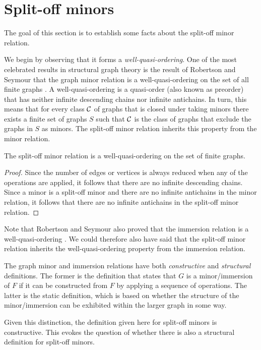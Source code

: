 \documentclass[11pt]{article}
\begin{document}
\section{Split-off minors}
The goal of this section is to establish some facts about the split-off minor relation. 
\par 
We begin by observing that it forms a \emph{well-quasi-ordering}.
One of the most celebrated results in structural graph theory is the result of Robertson and Seymour that the graph minor relation is a well-quasi-ordering on the set of all finite graphs \cite{ROBERTSON2004325}. A well-quasi-ordering is a quasi-order (also known as preorder) that has neither infinite descending chains nor infinite antichains.
In turn, this means that for every class $\mathcal{C}$ of graphs that is closed under taking minors there exists a finite set of graphs $S$ such that $\mathcal{C}$ is the class of graphs that exclude the graphs in $S$ as minors.
The split-off minor relation inherits this property from the minor relation.
\begin{proposition}
\label{prop:split-off-is-wqo}
    The split-off minor relation is a well-quasi-ordering on the set of finite graphs.
\end{proposition}
\begin{proof}
    Since the number of edges or vertices is always reduced when any of the operations are applied, it follows that there are no infinite descending chains. Since a minor is a split-off minor and there are no infinite antichains in the minor relation, it follows that there are no infinite antichains in the split-off minor relation. 
\end{proof}
Note that Robertson and Seymour also proved that the immersion relation is a well-quasi-ordering \cite{ROBERTSON2010181}. We could therefore also have said that the split-off minor relation inherits the well-quasi-ordering property from the immersion relation.
\par
The graph minor and immersion relations have both \emph{constructive} and \emph{structural} definitions. The former is the definition that states that $G$ is a minor/immersion of $F$ if it can be constructed from $F$ by applying a sequence of operations. The latter is the static definition, which is based on whether the structure of the minor/immersion can be exhibited within the larger graph in some way.
\par 
Given this distinction, the definition given here for split-off minors is constructive.
This evokes the question of whether there is also a structural definition for split-off minors. 
\end{document}
